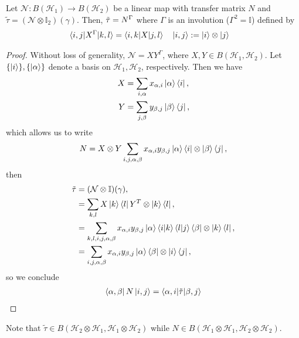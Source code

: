 \documentclass[../../note.tex]{subfiles}
\begin{document}
\begin{proposition}
Let $\mathcal{N}: B(\mathcal{H}_1) \rightarrow B(\mathcal{H}_2)$ be a linear map with transfer matrix $N$ and $\tilde{\tau} = (\mathcal{N}\otimes \mathbb{I}_2)(\gamma)$. Then, $\Tilde{\tau}=N^{\Gamma}$ where $\Gamma$ is an involution ($\Gamma^2 = \mathbb{I}$) defined by 
\begin{align}
    \braket{i,j|X^{\Gamma}|k,l}&=\braket{i,k|X|j,l} \quad \ket{i,j}:= \ket{i}\otimes \ket{j}
\end{align}
\end{proposition}

\begin{tcolorbox}[colframe=black,breakable, colback=black!5, arc=0pt, outer arc=0pt,boxrule=0.5pt]
\begin{proof}
Without loss of generality, $\mathcal{N}=XY^{\Gamma}$, where $X,Y \in B(\mathcal{H}_1,\mathcal{H}_2)$. Let $\{\ket{i}\}, \{\ket{\alpha}\}$ denote a basis on $\mathcal{H}_1,\mathcal{H}_2$, respectively. Then we have 
\begin{align}
    X&=\sum_{i,\alpha} x_{\alpha,i} \ket{\alpha}\bra{i},\\
    Y&= \sum_{j,\beta} y_{\beta,j} \ket{\beta}\bra{j},
\end{align}
which allows us to write
\begin{align}
    N=X\otimes Y \sum_{i,j,\alpha,\beta} x_{\alpha,i} y_{\beta,j} \ket{\alpha}\bra{i} \otimes \ket{\beta}\bra{j},
\end{align}
then 
\begin{align}
    \tilde{\tau} &= (\mathcal{N}\otimes \mathbb{I})(\gamma),\\
    &= \sum_{k,l} X \ket{k}\bra{l} Y^T \otimes \ket{k}\bra{l}, \\
    &=\sum_{k,l,i,j,\alpha,\beta} x_{\alpha, i} y_{\beta,j} \ket{\alpha}\braket{i|k}\braket{l|j}\bra{\beta}\otimes \ket{k}\bra{l}, \\
    &= \sum_{i,j,\alpha,\beta} x_{\alpha,i} y_{\beta,j} \ket{\alpha}\bra{\beta} \otimes \ket{i}\bra{j},
\end{align}
so we conclude
\begin{align}
    \bra{\alpha,\beta}N\ket{i,j} = \braket{\alpha,i|\tilde{\tau}|\beta,j}
\end{align}
\end{proof}
Note that $\tilde{\tau}\in B(\mathcal{H}_2 \otimes \mathcal{H}_1,\mathcal{H}_1\otimes \mathcal{H}_2)$ while $N\in B(\mathcal{H}_1\otimes \mathcal{H}_1, \mathcal{H}_2 \otimes \mathcal{H}_2)$.
\end{tcolorbox}
\end{document}
